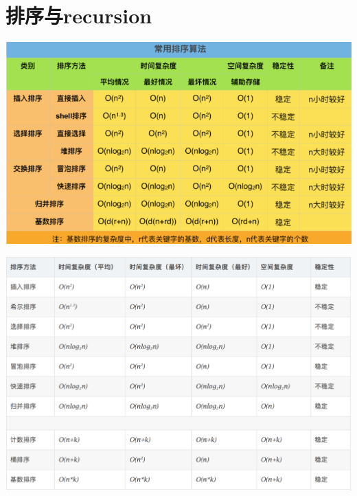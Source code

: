 \documentclass[9pt, b5paaper]{book}
\begin{document}
\chapter{排序与recursion}
\label{sec-9}

\includegraphics[width=.9\linewidth]{./pic/sort.png}

\includegraphics[width=.9\linewidth]{./pic/sort2.png}
\end{document}
